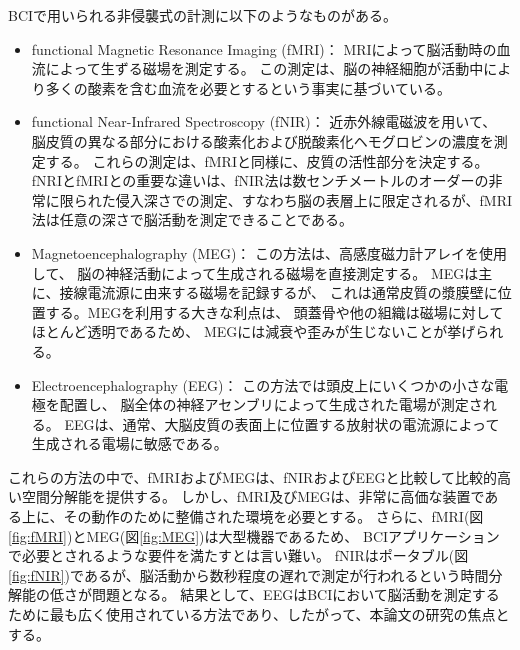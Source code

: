 BCIで用いられる非侵襲式の計測に以下のようなものがある。
\begin{itemize}
    \item functional Magnetic Resonance Imaging (fMRI)：
    MRIによって脳活動時の血流によって生ずる磁場を測定する。
    この測定は、脳の神経細胞が活動中により多くの酸素を含む血流を必要とするという事実に基づいている。
    \item functional Near-Infrared Spectroscopy (fNIR)：
    近赤外線電磁波を用いて、
    脳皮質の異なる部分における酸素化および脱酸素化ヘモグロビンの濃度を測定する。
    これらの測定は、fMRIと同様に、皮質の活性部分を決定する。 
    fNRIとfMRIとの重要な違いは、fNIR法は数センチメートルのオーダーの非常に限られた侵入深さでの測定、すなわち脳の表層上に限定されるが、fMRI法は任意の深さで脳活動を測定できることである。
    \item Magnetoencephalography (MEG)：
    この方法は、高感度磁力計アレイを使用して、
    脳の神経活動によって生成される磁場を直接測定する。
    MEGは主に、接線電流源に由来する磁場を記録するが、
    これは通常皮質の漿膜壁に位置する。MEGを利用する大きな利点は、
    頭蓋骨や他の組織は磁場に対してほとんど透明であるため、
    MEGには減衰や歪みが生じないことが挙げられる。
    \item Electroencephalography (EEG)：
    この方法では頭皮上にいくつかの小さな電極を配置し、
    脳全体の神経アセンブリによって生成された電場が測定される。
    EEGは、通常、大脳皮質の表面上に位置する放射状の電流源によって
    生成される電場に敏感である。
\end{itemize}
これらの方法の中で、fMRIおよびMEGは、fNIRおよびEEGと比較して比較的高い空間分解能を提供する。
しかし、fMRI及びMEGは、非常に高価な装置である上に、その動作のために整備された環境を必要とする。
さらに、fMRI(図\ref{fig:fMRI})とMEG(図\ref{fig:MEG})は大型機器であるため、
BCIアプリケーションで必要とされるような要件を満たすとは言い難い。
fNIRはポータブル(図\ref{fig:fNIR})であるが、脳活動から数秒程度の遅れで測定が行われるという時間分解能の低さが問題となる。
結果として、EEGはBCIにおいて脳活動を測定するために最も広く使用されている方法であり、したがって、本論文の研究の焦点とする。

